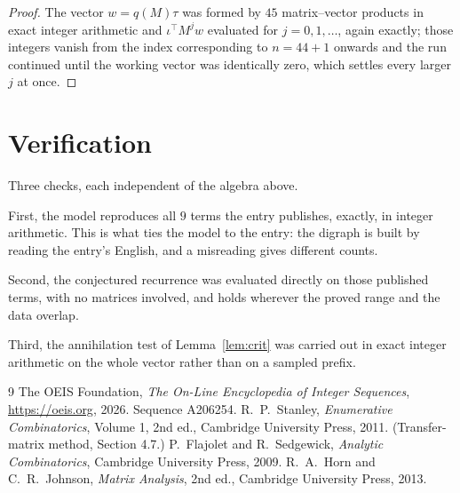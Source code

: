 \documentclass[11pt,a4paper]{article}
\theoremstyle{plain}
\theoremstyle{definition}
\begin{document}
\begin{proof}
The vector $w=q(M)\tau$ was formed by $45$ matrix--vector products in exact integer
arithmetic and $\iota^{\!\top}M^{j}w$ evaluated for $j=0,1,\dots$, again exactly; those
integers vanish from the index corresponding to $n=44+1$ onwards and the run continued
until the working vector was identically zero, which settles every larger $j$ at once.
\end{proof}

\section{Verification}

Three checks, each independent of the algebra above.

First, the model reproduces all $9$ terms the entry publishes, exactly, in integer
arithmetic. This is what ties the model to the entry: the digraph is built by reading the
entry's English, and a misreading gives different counts.

Second, the conjectured recurrence was evaluated directly on those published terms, with no
matrices involved, and holds wherever the proved range and the data overlap.

Third, the annihilation test of Lemma~\ref{lem:crit} was carried out in exact integer
arithmetic on the whole vector rather than on a sampled prefix.

\begin{thebibliography}{9}
 The OEIS Foundation, \emph{The On-Line Encyclopedia of Integer
Sequences}, \url{https://oeis.org}, 2026. Sequence A206254.
 R.~P.~Stanley, \emph{Enumerative Combinatorics}, Volume 1, 2nd ed.,
Cambridge University Press, 2011. (Transfer-matrix method, Section 4.7.)
 P.~Flajolet and R.~Sedgewick, \emph{Analytic Combinatorics}, Cambridge
University Press, 2009.
 R.~A.~Horn and C.~R.~Johnson, \emph{Matrix Analysis}, 2nd ed., Cambridge
University Press, 2013.
\end{thebibliography}
\end{document}

